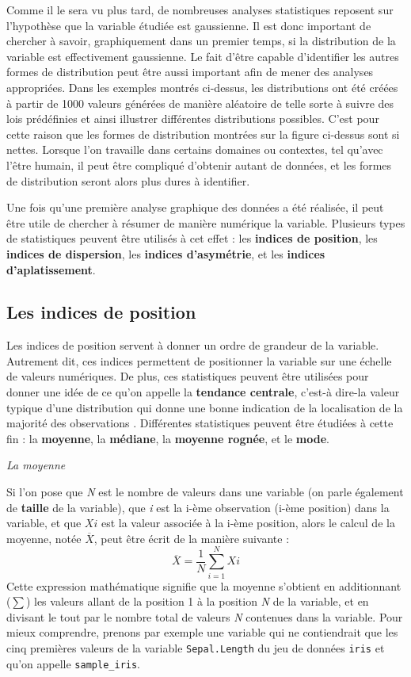 \documentclass[
  french,
]{book}
\begin{document}
Comme il le sera vu plus tard, de nombreuses analyses statistiques reposent sur l'hypothèse que la variable étudiée est gaussienne. Il est donc important de chercher à savoir, graphiquement dans un premier temps, si la distribution de la variable est effectivement gaussienne. Le fait d'être capable d'identifier les autres formes de distribution peut être aussi important afin de mener des analyses appropriées. Dans les exemples montrés ci-dessus, les distributions ont été créées à partir de 1000 valeurs générées de manière aléatoire de telle sorte à suivre des lois prédéfinies et ainsi illustrer différentes distributions possibles. C'est pour cette raison que les formes de distribution montrées sur la figure ci-dessus sont si nettes. Lorsque l'on travaille dans certains domaines ou contextes, tel qu'avec l'être humain, il peut être compliqué d'obtenir autant de données, et les formes de distribution seront alors plus dures à identifier.

Une fois qu'une première analyse graphique des données a été réalisée, il peut être utile de chercher à résumer de manière numérique la variable. Plusieurs types de statistiques peuvent être utilisés à cet effet : les \textbf{indices de position}, les \textbf{indices de dispersion}, les \textbf{indices d'asymétrie}, et les \textbf{indices d'aplatissement}.

\hypertarget{les-indices-de-position}{%
\subsection{Les indices de position}\label{les-indices-de-position}}

Les indices de position servent à donner un ordre de grandeur de la variable. Autrement dit, ces indices permettent de positionner la variable sur une échelle de valeurs numériques. De plus, ces statistiques peuvent être utilisées pour donner une idée de ce qu'on appelle la \textbf{tendance centrale}, c'est-à dire-la valeur typique d'une distribution qui donne une bonne indication de la localisation de la majorité des observations \autocite{rousseletReactionTimesOther2020}. Différentes statistiques peuvent être étudiées à cette fin : la \textbf{moyenne}, la \textbf{médiane}, la \textbf{moyenne rognée}, et le \textbf{mode}.

\emph{La moyenne}

Si l'on pose que \emph{N} est le nombre de valeurs dans une variable (on parle également de \textbf{taille} de la variable), que \emph{i} est la i-ème observation (i-ème position) dans la variable, et que \(X{i}\) est la valeur associée à la i-ème position, alors le calcul de la moyenne, notée \(\overline{X}\), peut être écrit de la manière suivante :
\[\overline{X} = \frac{1}{N}\sum_{i=1}^{N} X{i}\]
Cette expression mathématique signifie que la moyenne s'obtient en additionnant (\(\sum\)) les valeurs allant de la position 1 à la position \emph{N} de la variable, et en divisant le tout par le nombre total de valeurs \emph{N} contenues dans la variable. Pour mieux comprendre, prenons par exemple une variable qui ne contiendrait que les cinq premières valeurs de la variable \texttt{Sepal.Length} du jeu de données \texttt{iris} et qu'on appelle \texttt{sample\_iris}.
\end{document}
